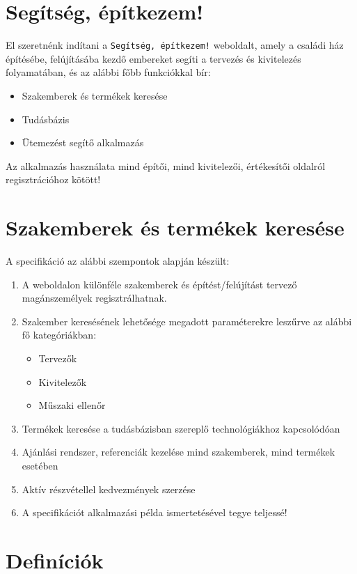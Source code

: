 \section{Segítség, építkezem!}

El szeretnénk indítani a \texttt{Segítség, építkezem!} weboldalt, amely a családi
ház építésébe, felújításába kezdő embereket segíti a tervezés és
kivitelezés folyamatában, és az alábbi főbb funkciókkal bír:

\begin{itemize}
    \item Szakemberek és termékek keresése
    \item Tudásbázis
    \item Ütemezést segítő alkalmazás
\end{itemize}

Az alkalmazás használata mind építői, mind kivitelezői, értékesítői oldalról regisztrációhoz kötött!

\section{Szakemberek és termékek keresése}

A specifikáció az alábbi szempontok alapján készült:

\begin{enumerate}
    \item A weboldalon különféle szakemberek és építést/felújítást tervező magánszemélyek regisztrálhatnak.
    \item Szakember keresésének lehetősége megadott paraméterekre leszűrve az alábbi fő kategóriákban:
    \begin{itemize}
        \item Tervezők
        \item Kivitelezők
        \item Műszaki ellenőr
    \end{itemize}
    \item Termékek keresése a tudásbázisban szereplő technológiákhoz kapcsolódóan
    \item Ajánlási rendszer, referenciák kezelése mind szakemberek, mind termékek esetében
    \item Aktív részvétellel kedvezmények szerzése
    \item A specifikációt alkalmazási példa ismertetésével tegye teljessé!
\end{enumerate}

\section{Definíciók}
